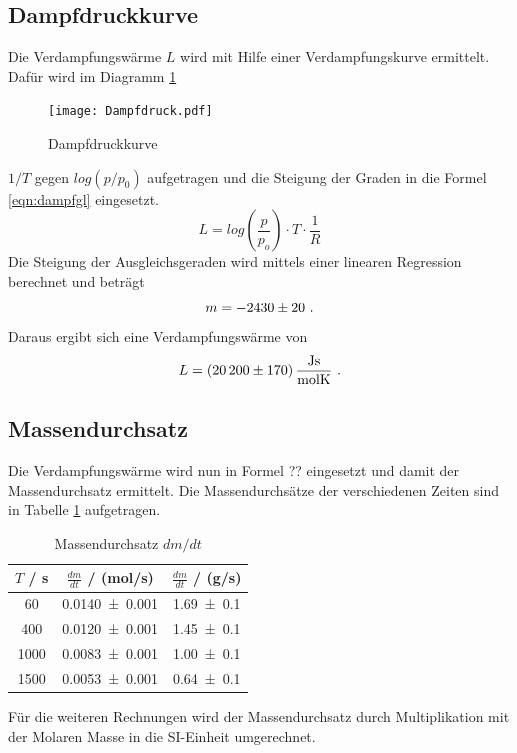 \subsection{Dampfdruckkurve}
Die Verdampfungswärme $L$ wird mit Hilfe einer Verdampfungskurve ermittelt. Dafür wird im Diagramm \ref{fig:dampfdruck}
\begin{figure}
  \centering
  \texttt{[image: Dampfdruck.pdf]}
  \caption{Dampfdruckkurve}
  \label{fig:dampfdruck}
\end{figure}
$1/T$ gegen $log(p/p_0)$ aufgetragen und die Steigung der Graden in die Formel \ref{eqn:dampfgl} eingesetzt.
\begin{equation}
  L = log \left( \frac{p}{p_o} \right) \cdot T \cdot \frac{1}{R}
  \label{eqn:dampfgl}
\end{equation}
Die Steigung der Ausgleichsgeraden wird mittels einer linearen Regression berechnet und beträgt
\begin{equation*}
  m = \num{-2430 +- 20} \ .
\end{equation*}
Daraus ergibt sich eine Verdampfungswärme von
\begin{equation}
  L = (\num{20200 +- 170}) \, \frac{\text{Js}}{\text{molK}} \ .
\end{equation}
\subsection{Massendurchsatz}
Die Verdampfungswärme wird nun in Formel ?? eingesetzt und damit der Massendurchsatz ermittelt. Die Massendurchsätze der verschiedenen Zeiten sind in Tabelle \ref{tab:dm/dt} aufgetragen.
\begin{table}
  \centering
  \begin{tabular}{c c c}
    \toprule
    $T$ / s & $\frac{dm}{dt}$ / (mol/s) & $\frac{dm}{dt}$ / (g/s) \\
    \midrule
    60   & \num{0.0140 +- 0.001} & \num{1.69 +- 0.1}\\
    400  & \num{0.0120 +- 0.001} & \num{1.45 +- 0.1}\\
    1000 & \num{0.0083 +- 0.001} & \num{1.00 +- 0.1}\\
    1500 & \num{0.0053 +- 0.001} & \num{0.64 +- 0.1}\\
    \bottomrule
  \end{tabular}
  \caption{Massendurchsatz $dm/dt$}
  \label{tab:dm/dt}
\end{table}
Für die weiteren Rechnungen wird der Massendurchsatz durch Multiplikation mit der Molaren Masse in die SI-Einheit umgerechnet.
